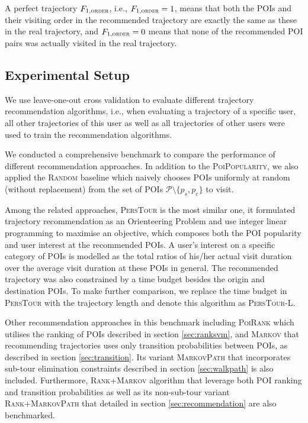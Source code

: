 A perfect trajectory $F_{1,\textsc{order}}$, i.e., $F_{1,\textsc{order}} = 1$, means that both the POIs and their visiting order in the
recommended trajectory are exactly the same as these in the real trajectory,
and $F_{1,\textsc{order}} = 0$ means that none of the recommended POI pairs was actually visited in the real trajectory.


\subsection{Experimental Setup}
We use leave-one-out cross validation to evaluate different trajectory recommendation algorithms,
i.e., when evaluating a trajectory of a specific user, all other trajectories of this user as well as
all trajectories of other users were used to train the recommendation algorithms.

We conducted a comprehensive benchmark to compare the performance of different recommendation approaches.
In addition to the \textsc{PoiPopularity}, we also applied the \textsc{Random} baseline which naively chooses 
POIs uniformly at random (without replacement) from the set of POIs $\mathcal{P} \setminus \{p_s, p_e \}$ to visit.

Among the related approaches, \textsc{PersTour}\cite{ijcai15} is the most similar one, it formulated 
trajectory recommendation as an Orienteering Problem and use integer linear programming to maximise 
an objective, which composes both the POI popularity and user interest at the recommended POIs.
A user's interest on a specific category of POIs is modelled as the total ratios of his/her actual visit duration 
over the average visit duration at these POIs in general.
The recommended trajectory was also constrained by a time budget besides the origin and destination POIs.
To make further comparison, we replace the time budget in \textsc{PersTour} with the trajectory length and
denote this algorithm as \textsc{PersTour-L}.

Other recommendation approaches in this benchmark including \textsc{PoiRank} which utilises the ranking of POIs
described in section \ref{sec:ranksvm}, and \textsc{Markov} that recommending trajectories uses only transition 
probabilities between POIs, as described in section \ref{sec:transition}. Its variant \textsc{MarkovPath} that incorporates 
sub-tour elimination constraints described in section \ref{sec:walkpath} is also included.
Furthermore, \textsc{Rank+Markov} algorithm that leverage both POI ranking and transition probabilities as well as
its non-sub-tour variant \textsc{Rank+MarkovPath} that detailed in section \ref{sec:recommendation} are also 
benchmarked.

